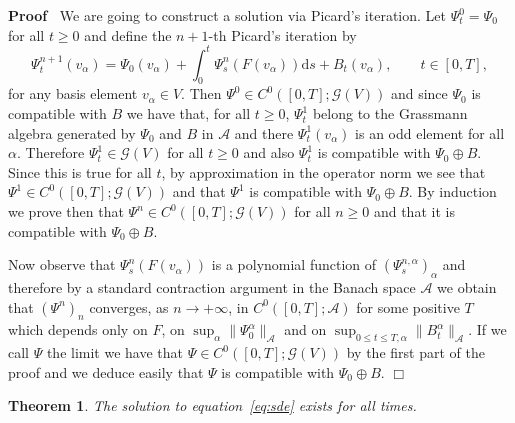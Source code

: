 \documentclass[11pt]{article}
\newcommand{\mathd}{\mathrm{d}}
\newenvironment{proof}{\noindent\textbf{Proof\ }}{\hspace*{\fill}$\Box$\medskip}
\newtheorem{theorem}{Theorem}
\begin{document}
\begin{proof}
  We are going to construct a solution via Picard's iteration. Let $\Psi^0_t =
  \Psi_0$ for all $t \geqslant 0$ and define the $n + 1$-th Picard's iteration
  by
  \[ \Psi_t^{n + 1} (v_{\alpha}) = \Psi_0 (v_{\alpha}) + \int_0^t \Psi_s^n (F
     (v_{\alpha})) \mathd s + B_t (v_{\alpha}), \qquad t \in [0, T], \]
  for any basis element $v_{\alpha} \in V$. Then $\Psi^0 \in C^0 ([0, T] ;
  \mathcal{G} (V))$ and since $\Psi_0$ is compatible with $B$ we have that,
  for all $t \geqslant 0$, $\Psi^1_t$ belong to the Grassmann algebra
  generated by $\Psi_0$ and $B$ in $\mathcal{A}$ and there $\Psi^1_t
  (v_{\alpha})$ is an odd element for all $\alpha$. Therefore $\Psi^1_t \in
  \mathcal{G} (V)$ for all $t \geqslant 0$ and also $\Psi^1_t$ is compatible
  with $\Psi_0 \oplus B$. Since this is true for all $t$, by approximation in
  the operator norm we see that $\Psi^1 \in C^0 ([0, T] ; \mathcal{G} (V))$
  and that $\Psi^1$ is compatible with $\Psi_0 \oplus B$. By induction we
  prove then that $\Psi^n \in C^0 ([0, T] ; \mathcal{G} (V))$ for all $n
  \geqslant 0$ and that it is compatible with $\Psi_0 \oplus B$.
  
  Now observe that $\Psi_s^n (F (v_{\alpha}))$ is a polynomial function of
  $(\Psi^{n, \alpha}_s)_{\alpha}$ and therefore by a standard contraction
  argument in the Banach space $\mathcal{A}$ we obtain that $(\Psi^n)_n$
  converges, as $n \rightarrow + \infty$, in $C^0 ([0, T] ; \mathcal{A})$ for
  some positive $T$ which depends only on $F$, on $\sup_{\alpha} \|
  \Psi_0^{\alpha} \|_{\mathcal{A}}$ and on $\sup_{0 \leqslant t \leqslant T,
  \alpha} \| B_t^{\alpha} \|_{\mathcal{A}}$. If we call $\Psi$ the limit we
  have that $\Psi \in C^0 ([0, T] ; \mathcal{G} (V))$ by the first part of the
  proof and we deduce easily that $\Psi$ is compatible with $\Psi_0 \oplus B$.
\end{proof}

\begin{theorem}
  \label{th:global-sol}The solution to equation~{\eqref{eq:sde}} exists for
  all times.
\end{theorem}
\end{document}
